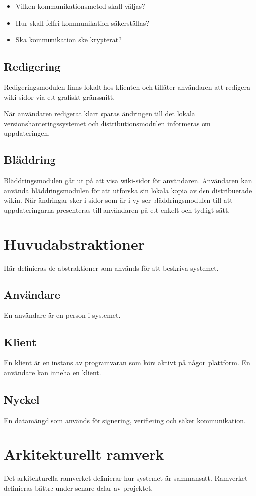 \begin{itemize}
\item Vilken kommunikationsmetod skall väljas?
\item Hur skall felfri kommunikation säkerställas?
\item Ska kommunikation ske krypterat?
\end{itemize}
\subsection{Redigering}
Redigeringsmodulen finns lokalt hos klienten och tillåter användaren att redigera wiki-sidor via ett grafiskt gränssnitt.

När användaren redigerat klart sparas ändringen till det lokala versionshanteringssystemet och distributionsmodulen informeras om uppdateringen.
\subsection{Bläddring}
Bläddringsmodulen går ut på att visa wiki-sidor för användaren. Användaren kan använda bläddringsmodulen för att utforska sin lokala kopia av den distribuerade wikin. När ändringar sker i sidor som är i vy ser bläddringsmodulen till att uppdateringarna presenteras till användaren på ett enkelt och tydligt sätt.
\section{Huvudabstraktioner}
Här definieras de abstraktioner som används för att beskriva systemet.
\subsection*{Användare}
En användare är en person i systemet. 
\subsection*{Klient}
En klient är en instans av programvaran som körs aktivt på någon plattform. En användare kan inneha en klient.
\subsection*{Nyckel}
En datamängd som används för signering, verifiering och säker kommunikation.
\section{Arkitekturellt ramverk}
Det arkitekturella ramverket definierar hur systemet är sammansatt. Ramverket definieras bättre under senare delar av projektet.


